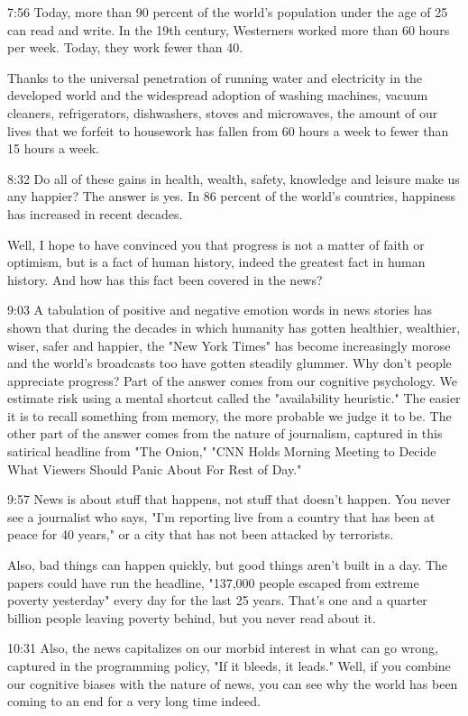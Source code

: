 \documentclass[10pt,titlepage]{article}
\begin{document}
7:56
Today, more than 90 percent of the world's population
under the age of 25 can read and write.
In the 19th century, Westerners worked more than 60 hours per week.
Today, they work fewer than 40.

Thanks to the universal penetration of running water and electricity
in the developed world
and the widespread adoption of washing machines, vacuum cleaners,
refrigerators, dishwashers, stoves and microwaves,
the amount of our lives that we forfeit to housework
has fallen from 60 hours a week
to fewer than 15 hours a week.

8:32
Do all of these gains in health, wealth, safety, knowledge and leisure
make us any happier?
The answer is yes.
In 86 percent of the world's countries,
happiness has increased in recent decades.

Well, I hope to have convinced you
that progress is not a matter of faith or optimism,
but is a fact of human history,
indeed the greatest fact in human history.
And how has this fact been covered in the news?

9:03
A tabulation of positive and negative emotion words in news stories
has shown that during the decades in which humanity has gotten healthier,
wealthier, wiser, safer and happier,
the "New York Times" has become increasingly morose
and the world's broadcasts too have gotten steadily glummer.
Why don't people appreciate progress?
Part of the answer comes from our cognitive psychology.
We estimate risk using a mental shortcut called the "availability heuristic."
The easier it is to recall something from memory,
the more probable we judge it to be.
The other part of the answer comes from the nature of journalism,
captured in this satirical headline from "The Onion,"
"CNN Holds Morning Meeting to Decide
What Viewers Should Panic About For Rest of Day."

9:57
News is about stuff that happens, not stuff that doesn't happen.
You never see a journalist who says,
"I'm reporting live from a country that has been at peace for 40 years,"
or a city that has not been attacked by terrorists.

Also, bad things can happen quickly,
but good things aren't built in a day.
The papers could have run the headline,
"137,000 people escaped from extreme poverty yesterday"
every day for the last 25 years.
That's one and a quarter billion people leaving poverty behind,
but you never read about it.

10:31
Also, the news capitalizes on our morbid interest
in what can go wrong,
captured in the programming policy, "If it bleeds, it leads."
Well, if you combine our cognitive biases with the nature of news,
you can see why the world has been coming to an end
for a very long time indeed.
\end{document}
